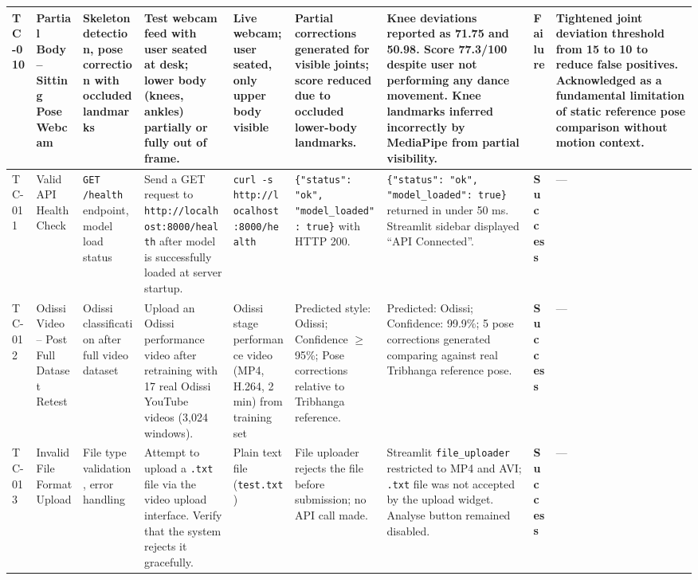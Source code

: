 \documentclass[12pt,a4paper]{article}
\begin{document}
\begin{longtable}{|P{0.6cm}|P{2.2cm}|P{2.2cm}|P{2.8cm}|P{2.4cm}|P{3.0cm}|P{3.0cm}|P{1.1cm}|P{2.4cm}|}
TC-010 &
Partial Body -- Sitting Pose Webcam &
Skeleton detection, pose correction with occluded landmarks &
Test webcam feed with user seated at desk; lower body (knees, ankles) partially or fully out of frame. &
Live webcam; user seated, only upper body visible &
Partial corrections generated for visible joints; score reduced due to occluded lower-body landmarks. &
Knee deviations reported as 71.75\degree{} and 50.98\degree{}. Score 77.3/100 despite user not performing any dance movement. Knee landmarks inferred incorrectly by MediaPipe from partial visibility. &
\textbf{Failure} &
Tightened joint deviation threshold from 15\degree{} to 10\degree{} to reduce false positives. Acknowledged as a fundamental limitation of static reference pose comparison without motion context. \\
\hline

TC-011 &
Valid API Health Check &
\texttt{GET /health} endpoint, model load status &
Send a GET request to \texttt{http://localhost:8000/health} after model is successfully loaded at server startup. &
\texttt{curl -s http://localhost:8000/health} &
\texttt{\{"status": "ok", "model\_loaded": true\}} with HTTP 200. &
\texttt{\{"status": "ok", "model\_loaded": true\}} returned in under 50 ms. Streamlit sidebar displayed ``API Connected''. &
\textbf{Success} &
--- \\
\hline

TC-012 &
Odissi Video -- Post Full Dataset Retest &
Odissi classification after full video dataset &
Upload an Odissi performance video after retraining with 17 real Odissi YouTube videos (3,024 windows). &
Odissi stage performance video (MP4, H.264, 2 min) from training set &
Predicted style: Odissi; Confidence $\geq$ 95\%; Pose corrections relative to Tribhanga reference. &
Predicted: Odissi; Confidence: 99.9\%; 5 pose corrections generated comparing against real Tribhanga reference pose. &
\textbf{Success} &
--- \\
\hline

TC-013 &
Invalid File Format Upload &
File type validation, error handling &
Attempt to upload a \texttt{.txt} file via the video upload interface. Verify that the system rejects it gracefully. &
Plain text file (\texttt{test.txt}) &
File uploader rejects the file before submission; no API call made. &
Streamlit \texttt{file\_uploader} restricted to MP4 and AVI; \texttt{.txt} file was not accepted by the upload widget. Analyse button remained disabled. &
\textbf{Success} &
--- \\
\hline


\end{longtable}
\end{document}
